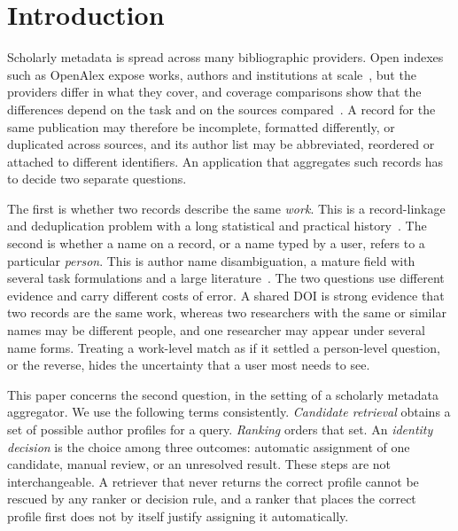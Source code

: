 \section{Introduction}
\label{sec:introduction}

Scholarly metadata is spread across many bibliographic providers. Open indexes such as OpenAlex expose works, authors and institutions at scale~\cite{priem2022openalex}, but the providers differ in what they cover, and coverage comparisons show that the differences depend on the task and on the sources compared~\cite{culbert2025openalexcoverage}. A record for the same publication may therefore be incomplete, formatted differently, or duplicated across sources, and its author list may be abbreviated, reordered or attached to different identifiers. An application that aggregates such records has to decide two separate questions.

The first is whether two records describe the same \emph{work}. This is a record-linkage and deduplication problem with a long statistical and practical history~\cite{fellegi1969recordlinkage,elmagarmid2007duplicate,forbes2024deduplicator}. The second is whether a name on a record, or a name typed by a user, refers to a particular \emph{person}. This is author name disambiguation, a mature field with several task formulations and a large literature~\cite{ferreira2012brief,rodrigues2024andreview,debonis2023graph}. The two questions use different evidence and carry different costs of error. A shared DOI is strong evidence that two records are the same work, whereas two researchers with the same or similar names may be different people, and one researcher may appear under several name forms. Treating a work-level match as if it settled a person-level question, or the reverse, hides the uncertainty that a user most needs to see.

This paper concerns the second question, in the setting of a scholarly metadata aggregator. We use the following terms consistently. \emph{Candidate retrieval} obtains a set of possible author profiles for a query. \emph{Ranking} orders that set. An \emph{identity decision} is the choice among three outcomes: automatic assignment of one candidate, manual review, or an unresolved result. These steps are not interchangeable. A retriever that never returns the correct profile cannot be rescued by any ranker or decision rule, and a ranker that places the correct profile first does not by itself justify assigning it automatically.

